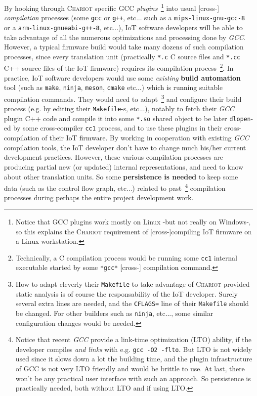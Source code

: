 By hooking through \textsc{Chariot} specific GCC
\emph{plugins}~\footnote{Notice that GCC plugins work mostly on Linux
  -but not really on Windows-, so this explains the \textsc{Chariot}
  requirement of [cross-]compiling IoT firmware on a Linux
  workstation.}  into usual [cross-] \emph{compilation} processes
(some \texttt{gcc} or \texttt{g++}, etc... such as a
\texttt{mips-linux-gnu-gcc-8} or a \texttt{arm-linux-gnueabi-g++-8},
etc...), IoT software developers will be able to take advantage of all
the numerous optimizations and processing done by \emph{GCC}. However,
a typical firmware build would take many dozens of such compilation
processes, since every translation unit (practically \texttt{*.c} C
source files and \texttt{*.cc} C++ source files of the IoT firmware)
requires its compilation process~\footnote{Technically, a C
  compilation process would be running some \texttt{cc1} internal
  executable started by some \texttt{*gcc*} [cross-] compilation
  command.}. In practice, IoT software developers would use some
\emph{existing} \textbf{build automation} tool (such as \texttt{make},
\texttt{ninja}, \texttt{meson}, \texttt{cmake} etc...)   which is running suitable compilation commands. They
would need to adapt~\footnote{How to adapt cleverly their
  \texttt{Makefile} to take advantage of \textsc{Chariot} provided
  static analysis is of course the responsability of the IoT
  developer. Surely several extra lines are needed, and the
  \texttt{CFLAGS=} line of their \texttt{Makefile} should be
  changed. For other builders such as \texttt{ninja}, etc..., some
  similar configuration changes would be needed.}  and configure their
build process (e.g. by editing their \texttt{Makefile}-s, etc...),
notably to fetch their \emph{GCC} plugin C++ code and compile it into
some \texttt{*.so} shared object to be later \texttt{dlopen}-ed by
some cross-compiler \texttt{cc1} process, and to use these plugins in
their cross-compilation of their IoT firmware. By working in
cooperation with existing \emph{GCC} compilation tools, the IoT
developer don't have to change much his/her current development
practices. However, these various compilation processes are producing
partial new (or updated) internal representations, and need to know
about other translation units. So some \textbf{persistence is needed}
to keep some data (such as the control flow graph, etc...) related to
past~\footnote{Notice that recent \emph{GCC} provide a link-time
  optimization (LTO) ability, if the developer compiles \emph{and
    links} with e.g. \texttt{gcc -O2 -flto}. But LTO is not widely
  used since it slows down a lot the building time, and the plugin
  infrastructure of GCC is not very LTO friendly and would be brittle
  to use. At last, there won't be any practical user interface with
  such an approach. So persistence is practically needed, both without
  LTO and if using LTO.}  compilation processes during perhaps the
entire project development work.

